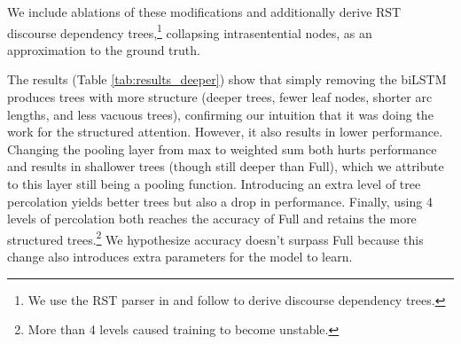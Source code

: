 We include ablations of these modifications and additionally derive RST discourse dependency trees,\footnote{We use the RST parser in \citet{Feng:2014} and follow \citet{Hirao:2013} to derive discourse dependency trees.} collapsing intrasentential nodes, as an approximation to the ground truth.

The results (Table \ref{tab:results_deeper}) show that simply removing the biLSTM produces trees with more structure (deeper trees, fewer leaf nodes, shorter arc lengths, and less vacuous trees), confirming our intuition that it was doing the work for the structured attention. However, it also results in lower performance. Changing the pooling layer from max to  weighted sum both hurts performance and results in shallower trees (though still deeper than Full), which we attribute to this layer still being a pooling function. Introducing an extra level of tree percolation yields better trees but also a drop in performance. Finally, using 4 levels of percolation both reaches the accuracy of Full and retains the more structured trees.\footnote{More than 4 levels caused training to become unstable.} We hypothesize accuracy doesn't surpass Full because this change also introduces extra parameters for the model to learn.


